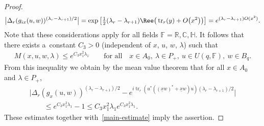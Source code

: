 \begin{proof}
\begin{gather*}
\big|\Delta_r(g_{ix}(u,w))^{(\lambda_r-\lambda_{r+1})/2}\big|=\exp\big[\tfrac 12 (\lambda_r-\lambda_{r+1})
 \Ree\big(\operatorname{tr}_r(y)+ O\big(x^2\big)\big)\big]=e^{(\lambda_r -\lambda_{r+1}) O(x^2)}.
\end{gather*}
Note that these considerations apply for all f\/ields $\mathbb F=\mathbb R, \mathbb C, \mathbb H$. It follows that there
exists a~constant $C_3>0$ (independent of $x$, $u$, $w$, $\lambda$) such that
\begin{gather*}
M(x,u,w,\lambda)\le e^{C_3x_1^2\lambda_1}
\qquad
\text{for all}
\quad
x\in A_0, \  \lambda\in P_+,  \ u\in U(q, \mathbb F), \ w \in B_q.
\end{gather*}
From this inequality we obtain by the mean value theorem that for all $x\in A_0$ and $\lambda\in P_+$,
\begin{gather*}
\big|  \Delta_r(g_{x}(u,w))^{(\lambda_r-\lambda_{r+1})/2}- e^{i \operatorname{tr}_r(u^*((\underline x w)^*+ \underline x w)u)
 (\lambda_r-\lambda_{r+1})/2}\big|
\\
\qquad{}
 \leq e^{C_3x_1^2\lambda_1}-1 \leq C_3 x_1^2\lambda_1 e^{C_3x_1^2\lambda_1}.
\end{gather*}
These estimates together with~\eqref{main-estimate} imply the assertion.
\end{proof}

